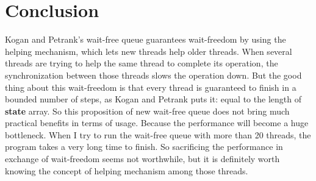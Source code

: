 \documentclass[a4paper]{article}
\begin{document}
\section{Conclusion}
Kogan and Petrank's wait-free queue guarantees wait-freedom by using the helping mechanism, which lets new threads help older threads. When several threads are trying to help the same thread to complete its operation, the synchronization between those threads slows the operation down. But the good thing about this wait-freedom is that every thread is guaranteed to finish in a bounded number of steps, as Kogan and Petrank puts it: equal to the length of \textbf{state} array. So this proposition of new wait-free queue does not bring much practical benefits in terms of usage. Because the performance will become a huge bottleneck. When I try to run the wait-free queue with more than 20 threads, the program takes a very long time to finish. So sacrificing the performance in exchange of wait-freedom seems not worthwhile, but it is definitely worth knowing the concept of helping mechanism among those threads.



\end{document}
